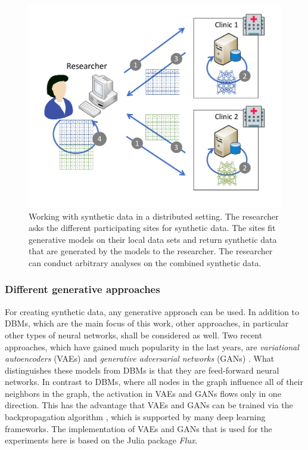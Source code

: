 \documentclass[12pt]{article}
\newcommand{\apkg}[1]{\emph{#1}}
\newcommand{\circlenum}[1]{\raisebox{.5pt}{\textcircled{\raisebox{-.9pt} {#1}}}}
\begin{document}
\begin{figure}[h]
   \centering
   \includegraphics[scale=0.7]{images/synthetic_data_principle.pdf}
   \caption{Working with synthetic data in a distributed setting. \circlenum{1}The researcher asks the different participating sites for synthetic data. \circlenum{2}The sites fit generative models on their local data sets and \circlenum{3} return synthetic data that are generated by the models to the researcher. \circlenum{4}The researcher can conduct arbitrary analyses on the combined synthetic data.}
   \label{fig:syntheticdataprinciple}
 \end{figure}

\subsubsection{Different generative approaches}\label{diffgenmodels}

For creating synthetic data, any generative approach can be used.
In addition to DBMs, which are the main focus of this work, other approaches, in particular other types of neural networks, shall be considered as well.
Two recent approaches, which have gained much popularity in the last years, are {\em variational autoencoders} (VAEs) \citep{Kingma2013} and {\em generative adversarial networks} (GANs) \citep{goodfellow_generative_2014}.
What distinguishes these models from DBMs is that they are feed-forward neural networks.
In contrast to DBMs, where all nodes in the graph influence all of their neighbors in the graph, the activation in VAEs and GANs flows only in one direction.
This has the advantage that VAEs and GANs can be trained via the backpropagation algorithm \citep{backpropagation}, which is supported by many deep learning frameworks.
The implementation of VAEs and GANs that is used for the experiments here is based on the Julia package \apkg{Flux}.
\end{document}
